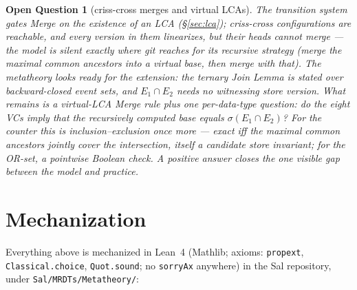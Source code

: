 \documentclass[11pt]{article}
\newtheorem{openq}[theorem]{Open Question}
\newcommand{\lean}[1]{\texttt{#1}}
\begin{document}
\begin{openq}[criss-cross merges and virtual LCAs]
\label{oq:crisscross}
The transition system gates Merge on the existence of an LCA
(\S\ref{sec:lca}); criss-cross configurations are reachable, and every
version in them linearizes, but their heads cannot merge --- the model
is silent exactly where git reaches for its \emph{recursive} strategy
(merge the maximal common ancestors into a virtual base, then merge with
that). The metatheory looks ready for the extension: the ternary Join
Lemma is stated over backward-closed \emph{event sets}, and
$E_1 \cap E_2$ needs no witnessing store version. What remains is a
virtual-LCA Merge rule plus one per-data-type question: do the eight VCs
imply that the recursively computed base equals
$\sigma(E_1 \cap E_2)$? For the counter this is inclusion--exclusion
once more --- exact iff the maximal common ancestors jointly cover the
intersection, itself a candidate store invariant; for the OR-set, a
pointwise Boolean check. A positive answer closes the one visible gap
between the model and practice.
\end{openq}

\section{Mechanization}
\label{sec:mech}

Everything above is mechanized in Lean~4 (Mathlib; axioms:
\lean{propext}, \lean{Classical.choice}, \lean{Quot.sound}; no
\lean{sorryAx} anywhere) in the Sal repository, under
\lean{Sal/MRDTs/Metatheory/}:
\end{document}
